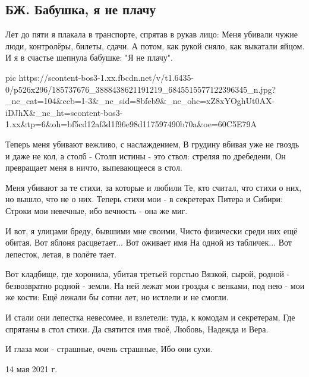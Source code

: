  
 
 
 
 

\subsection{БЖ. Бабушка, я не плачу}
\label{sec:13_05_2021.fb.bilchenko_evgenia.1.babushka}

Лет до пяти я плакала в транспорте, спрятав в рукав лицо:
Меня убивали чужие люди, контролёры, билеты, сдачи.
А потом, как рукой сняло, как выкатали яйцом.
И я в счастье шепнула бабушке: 
"Я не плачу".

\ifcmt
  pic https://scontent-bos3-1.xx.fbcdn.net/v/t1.6435-0/p526x296/185737676_3888438621191219_6845515577122396345_n.jpg?_nc_cat=104&ccb=1-3&_nc_sid=8bfeb9&_nc_ohc=xZ8xYOghUt0AX-iDJhX&_nc_ht=scontent-bos3-1.xx&tp=6&oh=bf5cd12af3d1f96e98d117597490b70a&oe=60C5E79A
\fi

Теперь меня убивают вежливо, с наслаждением,
В грудину вбивая уже не гвоздь и даже не кол, а столб -
Столп истины - это ствол: стреляя по дребедени,
Он превращает меня в ничто, выпевающееся в стол.

Меня убивают за те стихи, за которые и любили
Те, кто считал, что стихи о них, но вышло, что не о них.
Теперь стихи мои - в секретерах Питера и Сибири:
Строки мои невечные, ибо вечность - она же миг.

И вот, я улицами бреду, бывшими мне своими,
Чисто физически среди них ещё обитая.
Вот яблоня расцветает... Вот оживает имя
На одной из табличек... Вот лепесток, летая, в полёте тает.

Вот кладбище, где хоронила, убитая третьей горстью
Вязкой, сырой, родной - безвозвратно родной - земли.
На ней лежат мои гроздья с венками, под нею - мои же кости:
Ещё лежали бы сотни лет, но истлели и не смогли.

И стали они лепестка невесомее, и взлетели: туда, к комодам и секретерам, 
Где спрятаны в стол стихи.
Да святится имя твоё, Любовь, Надежда и Вера.

И глаза мои - страшные, очень страшные,
Ибо они сухи.

14 мая 2021 г.
